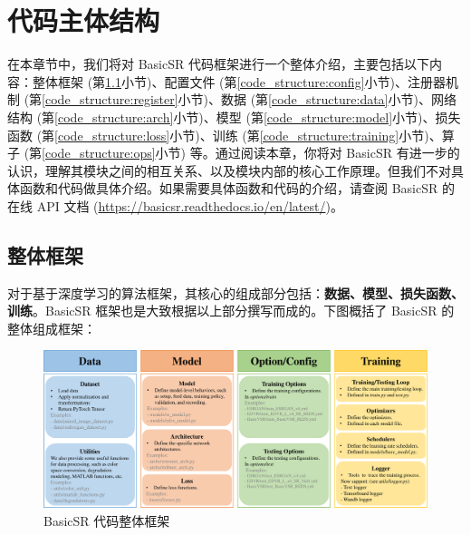 \documentclass[../main.tex]{subfiles}
\begin{document}
\chapter{代码主体结构}
\vspace{-2cm}

在本章节中，我们将对 BasicSR 代码框架进行一个整体介绍，主要包括以下内容：整体框架 (第\ref{code_structure:overview}小节)、配置文件 (第\ref{code_structure:config}小节)、注册器机制 (第\ref{code_structure:register}小节)、数据 (第\ref{code_structure:data}小节)、网络结构 (第\ref{code_structure:arch}小节)、模型 (第\ref{code_structure:model}小节)、损失函数 (第\ref{code_structure:loss}小节)、训练 (第\ref{code_structure:training}小节)、算子 (第\ref{code_structure:ops}小节) 等。通过阅读本章，你将对 BasicSR 有进一步的认识，理解其模块之间的相互关系、以及模块内部的核心工作原理。但我们不对具体函数和代码做具体介绍。如果需要具体函数和代码的介绍，请查阅 BasicSR 的在线 API 文档 (\url{https://basicsr.readthedocs.io/en/latest/})。


\section{整体框架} \label{code_structure:overview}
对于基于深度学习的算法框架，其核心的组成部分包括：\textbf{数据、模型、损失函数、训练}。BasicSR 框架也是大致根据以上部分撰写而成的。下图概括了 BasicSR 的整体组成框架：

\begin{figure}[htbp]
    \begin{center}
        \includegraphics[width=1\linewidth]{figures/main_framework.pdf}
    \end{center}
    \caption{BasicSR 代码整体框架}
    \label{fig:main_framework}
\end{figure}
\end{document}
